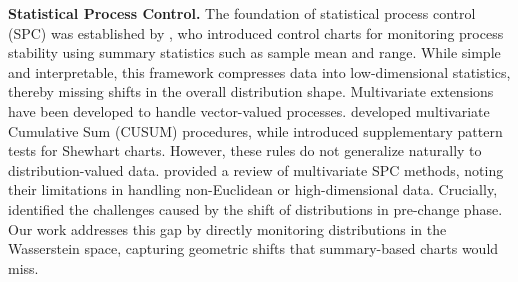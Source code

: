 \documentclass{article}
\theoremstyle{plain}
\theoremstyle{definition}
\theoremstyle{remark}
\begin{document}
\textbf{Statistical Process Control.} 
The foundation of statistical process control (SPC) was established by \citet{shewhart1931economic}, who introduced control charts for monitoring process stability using summary statistics such as sample mean and range. While simple and interpretable, this framework compresses data into low-dimensional statistics, thereby missing shifts in the overall distribution shape. 
Multivariate extensions have been developed to handle vector-valued processes. \citet{crosier1988multivariate} developed multivariate Cumulative Sum (CUSUM) procedures, while \citet{nelson1984shewhart} introduced supplementary pattern tests for Shewhart charts.
However, these rules do not generalize naturally to distribution-valued data. 
\citet{lowry1995review} provided a review of multivariate SPC methods, noting their limitations in handling non-Euclidean or high-dimensional data. 
Crucially, \citet{woodall1999research} identified the challenges caused by the shift of distributions in pre-change phase. Our work addresses this gap by directly monitoring distributions in the Wasserstein space, capturing geometric shifts that summary-based charts would miss.



\end{document}
